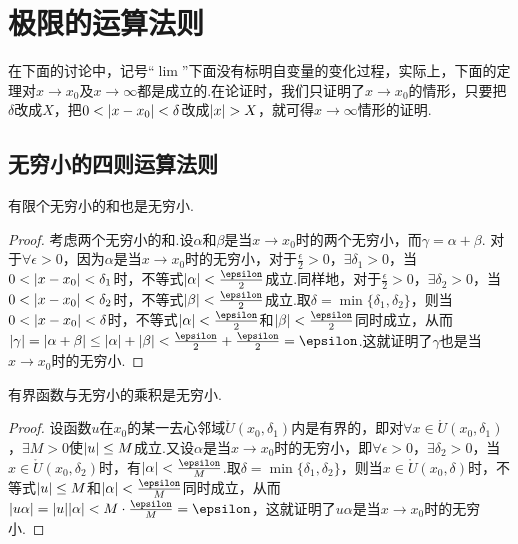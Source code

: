 \section{极限的运算法则}\label{section:极限.极限的运算法则}
在下面的讨论中，记号“\(\lim\)”下面没有标明自变量的变化过程，实际上，下面的定理对\(x \to x_0\)及\(x \to \infty\)都是成立的.在论证时，我们只证明了\(x \to x_0\)的情形，只要把\(\delta\)改成\(X\)，把\(0<\abs{x-x_0}<\delta\)改成\(\abs{x}>X\)，就可得\(x \to \infty\)情形的证明.

\subsection{无穷小的四则运算法则}
\begin{theorem}
有限个无穷小的和也是无穷小.
\begin{proof}
考虑两个无穷小的和.设\(\alpha\)和\(\beta\)是当\(x \to x_0\)时的两个无穷小，而\(\gamma = \alpha+\beta\).
对于\(\forall\epsilon>0\)，因为\(\alpha\)是当\(x \to x_0\)时的无穷小，对于\(\frac{\epsilon}{2}>0\)，\(\exists \delta_1 > 0\)，当\(0<\abs{x-x_0}<\delta_1\)时，不等式\(\abs{\alpha}<\frac{\epsilon}{2}\)成立.同样地，对于\(\frac{\epsilon}{2}>0\)，\(\exists \delta_2 > 0\)，当\(0<\abs{x-x_0}<\delta_2\)时，不等式\(\abs{\beta}<\frac{\epsilon}{2}\)成立.取\(\delta=\min\{\delta_1,\delta_2\}\)，则当\(0<\abs{x-x_0}<\delta\)时，不等式\(\abs{\alpha}<\frac{\epsilon}{2}\)和\(\abs{\beta}<\frac{\epsilon}{2}\)同时成立，从而\(\abs{\gamma}=\abs{\alpha+\beta}\leq\abs{\alpha}+\abs{\beta}<\frac{\epsilon}{2}+\frac{\epsilon}{2}=\epsilon\).这就证明了\(\gamma\)也是当\(x \to x_0\)时的无穷小.
\end{proof}
\end{theorem}

\begin{theorem}
有界函数与无穷小的乘积是无穷小.
\begin{proof}
设函数\(u\)在\(x_0\)的某一去心邻域\(\mathring{U}(x_0,\delta_1)\)内是有界的，即对\(\forall x\in\mathring{U}(x_0,\delta_1)\)，\(\exists M>0\)使\(\abs{u} \leq M\)成立.又设\(\alpha\)是当\(x \to x_0\)时的无穷小，即\(\forall \epsilon > 0\)，\(\exists \delta_2 > 0\)，当\(x\in\mathring{U}(x_0,\delta_2)\)时，有\(\abs{\alpha}<\frac{\epsilon}{M}\).取\(\delta=\min\{\delta_1,\delta_2\}\)，则当\(x\in\mathring{U}(x_0,\delta)\)时，不等式\(\abs{u} \leq M\)和\(\abs{\alpha} < \frac{\epsilon}{M}\)同时成立，从而\(\abs{u \alpha} = \abs{u}\abs{\alpha} < M \cdot \frac{\epsilon}{M} = \epsilon\)，这就证明了\(u \alpha\)是当\(x \to x_0\)时的无穷小.
\end{proof}
\end{theorem}

